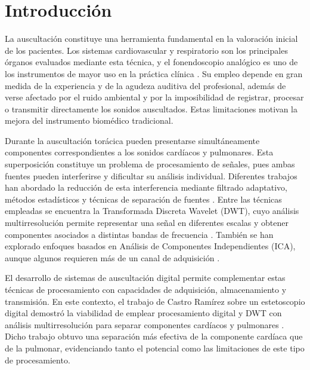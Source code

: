 \chapter*{Introducción}\label{Introduccion}

La auscultación constituye una herramienta fundamental en la valoración inicial de los pacientes. Los sistemas cardiovascular y respiratorio son los principales órganos evaluados mediante esta técnica, y el fonendoscopio analógico es uno de los instrumentos de mayor uso en la práctica clínica \cite{MedlinePlusAuscultacion2025}. Su empleo depende en gran medida de la experiencia y de la agudeza auditiva del profesional, además de verse afectado por el ruido ambiental y por la imposibilidad de registrar, procesar o transmitir directamente los sonidos auscultados. Estas limitaciones motivan la mejora del instrumento biomédico tradicional.

Durante la auscultación torácica pueden presentarse simultáneamente componentes correspondientes a los sonidos cardíacos y pulmonares. Esta superposición constituye un problema de procesamiento de señales, pues ambas fuentes pueden interferirse y dificultar su análisis individual. Diferentes trabajos han abordado la reducción de esta interferencia mediante filtrado adaptativo, métodos estadísticos y técnicas de separación de fuentes . Entre las técnicas empleadas se encuentra la Transformada Discreta Wavelet (DWT), cuyo análisis multirresolución permite representar una señal en diferentes escalas y obtener componentes asociados a distintas bandas de frecuencia . También se han explorado enfoques basados en Análisis de Componentes Independientes (ICA), aunque algunos requieren más de un canal de adquisición .

El desarrollo de sistemas de auscultación digital permite complementar estas técnicas de procesamiento con capacidades de adquisición, almacenamiento y transmisión. En este contexto, el trabajo de Castro Ramírez sobre un estetoscopio digital demostró la viabilidad de emplear procesamiento digital y DWT con análisis multirresolución para separar componentes cardíacos y pulmonares . Dicho trabajo obtuvo una separación más efectiva de la componente cardíaca que de la pulmonar, evidenciando tanto el potencial como las limitaciones de este tipo de procesamiento.


